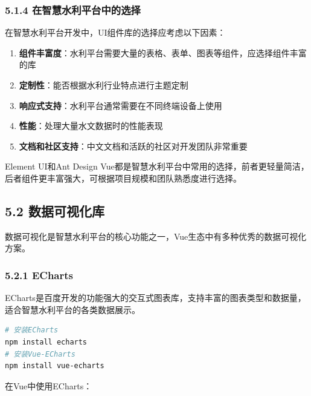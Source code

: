 \subsubsection{5.1.4
在智慧水利平台中的选择}\label{ux5728ux667aux6167ux6c34ux5229ux5e73ux53f0ux4e2dux7684ux9009ux62e9}

在智慧水利平台开发中，UI组件库的选择应考虑以下因素：

\begin{enumerate}
\def\labelenumi{\arabic{enumi}.}
\tightlist
\item
  \textbf{组件丰富度}：水利平台需要大量的表格、表单、图表等组件，应选择组件丰富的库
\item
  \textbf{定制性}：能否根据水利行业特点进行主题定制
\item
  \textbf{响应式支持}：水利平台通常需要在不同终端设备上使用
\item
  \textbf{性能}：处理大量水文数据时的性能表现
\item
  \textbf{文档和社区支持}：中文文档和活跃的社区对开发团队非常重要
\end{enumerate}

Element UI和Ant Design
Vue都是智慧水利平台中常用的选择，前者更轻量简洁，后者组件更丰富强大，可根据项目规模和团队熟悉度进行选择。

\subsection{5.2
数据可视化库}\label{ux6570ux636eux53efux89c6ux5316ux5e93}

数据可视化是智慧水利平台的核心功能之一，Vue生态中有多种优秀的数据可视化方案。

\subsubsection{5.2.1 ECharts}\label{echarts}

ECharts是百度开发的功能强大的交互式图表库，支持丰富的图表类型和数据量，适合智慧水利平台的各类数据展示。

\begin{lstlisting}[language=bash]
# 安装ECharts
npm install echarts
# 安装Vue-ECharts
npm install vue-echarts
\end{lstlisting}

在Vue中使用ECharts：

